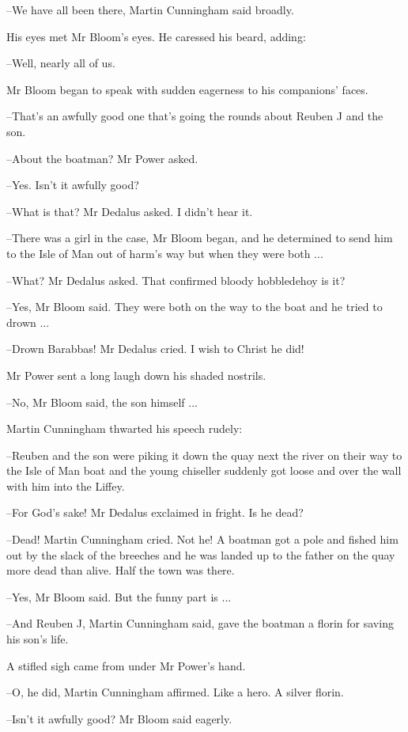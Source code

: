 --We have all been there,
Martin Cunningham said broadly.

His eyes met Mr Bloom's eyes.
He caressed his beard, adding:

--Well, nearly all of us.

Mr Bloom began to speak with sudden eagerness to his companions' faces.

--That's an awfully good one that's going the rounds
about Reuben J and the son.

--About the boatman?
Mr Power asked.

--Yes.
Isn't it awfully good?

--What is that?
Mr Dedalus asked.
I didn't hear it.

--There was a girl in the case,
Mr Bloom began,
and he determined to send him
to the Isle of Man out of harm's way
but when they were both ...

--What?
Mr Dedalus asked.
That confirmed bloody hobbledehoy is it?

--Yes,
Mr Bloom said.
They were both on the way to the boat and he tried to drown ...

--Drown Barabbas!
Mr Dedalus cried.
I wish to Christ he did!

Mr Power sent a long laugh down his shaded nostrils.

--No,
Mr Bloom said,
the son himself ...

Martin Cunningham thwarted his speech rudely:

--Reuben and the son were piking it down the quay next the river
on their way to the Isle of Man boat
and the young chiseller suddenly got loose
and over the wall with him into the Liffey.

--For God's sake!
Mr Dedalus exclaimed in fright.
Is he dead?

--Dead!
Martin Cunningham cried.
Not he!
A boatman got a pole and fished him out by the slack of the breeches
and he was landed up to the father on the quay
more dead than alive.
Half the town was there.

--Yes,
Mr Bloom said.
But the funny part is ...

--And Reuben J,
Martin Cunningham said,
gave the boatman a florin for saving his son's life.

A stifled sigh came from under Mr Power's hand.

--O, he did,
Martin Cunningham affirmed.
Like a hero.
A silver florin.

--Isn't it awfully good?
Mr Bloom said eagerly.

